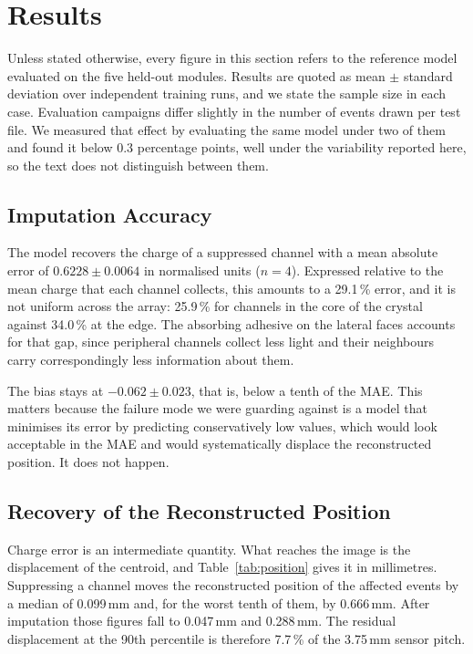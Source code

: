 \documentclass[10pt,conference]{IEEEtran}
\begin{document}
\section{Results}
\label{sec:results}

Unless stated otherwise, every figure in this section refers to the reference
model evaluated on the five held-out modules. Results are quoted as
mean $\pm$ standard deviation over independent training runs, and we state the
sample size in each case. Evaluation campaigns differ slightly in the number of
events drawn per test file. We measured that effect by evaluating the same
model under two of them and found it below 0.3 percentage points, well under
the variability reported here, so the text does not distinguish between them.

\subsection{Imputation Accuracy}
\label{sec:res-accuracy}

The model recovers the charge of a suppressed channel with a mean absolute
error of $0.6228 \pm 0.0064$ in normalised units ($n=4$). Expressed relative to
the mean charge that each channel collects, this amounts to a 29.1\,\% error,
and it is not uniform across the array: 25.9\,\% for channels in the core of the
crystal against 34.0\,\% at the edge. The absorbing adhesive on the lateral
faces accounts for that gap, since peripheral channels collect less light and
their neighbours carry correspondingly less information about them.

The bias stays at $-0.062 \pm 0.023$, that is, below a tenth of the MAE. This
matters because the failure mode we were guarding against is a model that
minimises its error by predicting conservatively low values, which would look
acceptable in the MAE and would systematically displace the reconstructed
position. It does not happen.

\subsection{Recovery of the Reconstructed Position}
\label{sec:res-position}

Charge error is an intermediate quantity. What reaches the image is the
displacement of the centroid, and Table~\ref{tab:position} gives it in
millimetres. Suppressing a channel moves the reconstructed position of the
affected events by a median of 0.099\,mm and, for the worst tenth of them, by
0.666\,mm. After imputation those figures fall to 0.047\,mm and 0.288\,mm. The
residual displacement at the 90th percentile is therefore 7.7\,\% of the
3.75\,mm sensor pitch.
\end{document}
